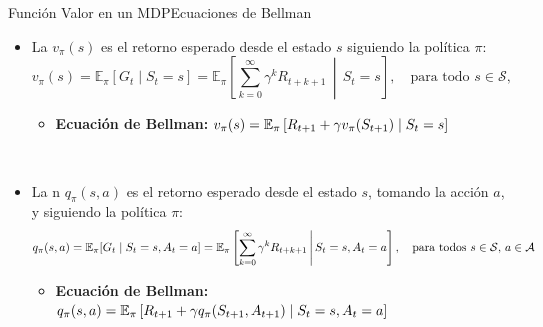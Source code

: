 \documentclass[10pt, envcountsect, handout, aspectratio=1610, hyperref={hypertexnames=true}]{beamer}
\begin{document}
\begin{frame}{Función Valor en un MDP}{Ecuaciones de Bellman}
\begin{itemize}
    \item La  \( v_\pi(s) \) es el retorno esperado desde el estado \( s \) siguiendo la política \( \pi \):
    \[
    v_\pi(s) = \mathbb{E}_\pi[G_t \mid S_t = s] 
    		 = \mathbb{E}_\pi \left[ \sum_{k=0}^\infty \gamma^k R_{t+k+1} \,\middle|\, S_t = s \right], 
		 		\quad \text{para todo } s \in \mathcal{S},
    \]
    
    \begin{itemize}
    \item \textbf{Ecuación de Bellman:}  \(\displaystyle  v_\pi(s) = \mathbb{E}_\pi \left[ R_{t+1} + \gamma v_\pi(S_{t+1}) \mid S_t = s \right] \)
    \end{itemize}
    
    ~
    
    \item  La n \( q_\pi(s, a) \) es el retorno esperado desde el estado \( s \), tomando la acción \( a \), y siguiendo la política \( \pi \):
    \[
    q_\pi(s, a) = \mathbb{E}_\pi[G_t \mid S_t = s, A_t = a] 
    		    = \mathbb{E}_\pi \left[ \sum_{k=0}^\infty \gamma^k R_{t+k+1} \,\middle|\, S_t = s, A_t=a\right], 
		 		\quad \text{para todos } s \in \mathcal{S},\, a\in {\cal A}
    \]
    
	\begin{itemize}
    \item \textbf{Ecuación de Bellman:}  \(\displaystyle  q_\pi(s, a) = \mathbb{E}_\pi \left[ R_{t+1} + \gamma q_\pi(S_{t+1}, A_{t+1}) \mid S_t = s, A_t = a \right] \)
    \end{itemize}
\end{itemize}

\end{frame}





\end{document}
